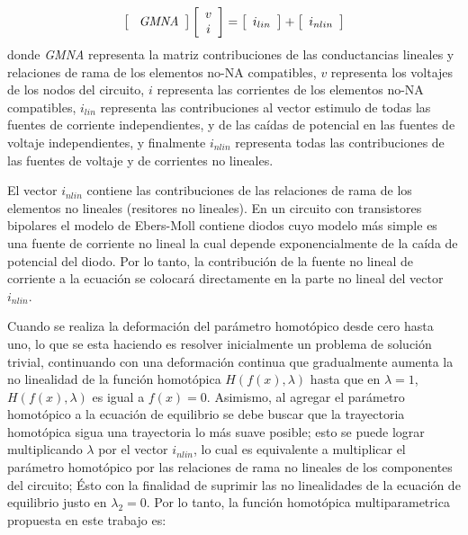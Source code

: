 \documentclass[conference,letterpaper,twocolumn]{IEEEtran}
\begin{document}
\begin{equation}
\left[ \begin{array}{c}
\text{ \it GMNA}
\end{array} \right]
\left[ \begin{array}{c}
{v} \\
{i} \\
\end{array} \right]
=
\left[ \begin{array}{c}
{i_{lin}}
\end{array} \right]
+
\left[ \begin{array}{c}
{i_{nlin}}
\end{array} \right]
\end{equation}
donde {\it GMNA} representa la matriz contribuciones de las conductancias lineales y relaciones de rama de los elementos no-NA compatibles,
${v}$   representa los voltajes de  los nodos del circuito, ${i}$  representa las corrientes de los elementos no-NA compatibles, ${i_{lin}}$ representa las contribuciones
al vector estimulo de todas las fuentes de corriente independientes, y de las caídas de potencial en las fuentes de voltaje independientes, y finalmente ${i_{nlin}}$ representa todas las contribuciones de las fuentes de voltaje y de corrientes no lineales.

El vector ${i_{nlin}}$ contiene las contribuciones de las relaciones de rama
de los elementos no lineales (resitores no lineales).
En un circuito con transistores bipolares el modelo de Ebers-Moll contiene
diodos cuyo modelo m\'as simple es una fuente de corriente no lineal la cual depende exponencialmente de la caída de potencial del diodo. Por lo tanto, la contribución  de la fuente no lineal de corriente a la ecuación se colocará
directamente en la parte no lineal del vector  ${i_{nlin}}$.

Cuando se realiza la deformación del parámetro homot\'opico desde cero hasta uno, lo que se esta haciendo es resolver
inicialmente un problema de solución trivial, continuando con una deformación continua que gradualmente
aumenta la no linealidad de la función homot\'opica $H(f(x),\lambda)$ hasta que en $\lambda=1$, $H(f(x),\lambda)$ es igual a $f(x)=0$.
Asimismo, al agregar el par\'ametro homot\'opico  a la ecuación de equilibrio se debe buscar que la trayectoria homot\'opica sigua una trayectoria lo m\'as suave posible; esto se puede lograr multiplicando $\lambda$ por el vector ${i_{nlin}}$, lo cual es equivalente a multiplicar el parámetro homotópico por las relaciones
de rama no lineales de los componentes del circuito;
Ésto con la finalidad
de suprimir las no linealidades de la ecuación de equilibrio justo en $\lambda_2=0$. Por lo tanto, la función homotópica multiparametrica propuesta en este trabajo es:
\end{document}
